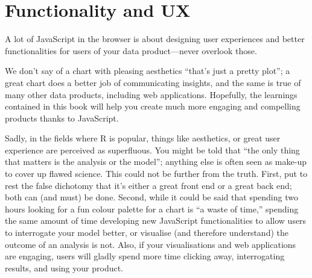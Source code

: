 \documentclass[10pt,]{krantz}
\begin{document}
\hypertarget{conclusion-ux}{%
\section{Functionality and UX}\label{conclusion-ux}}

A lot of JavaScript in the browser is about designing user experiences and better functionalities for users of your data product---never overlook those.

We don't say of a chart with pleasing aesthetics ``that's just a pretty plot''; a great chart does a better job of communicating insights, and the same is true of many other data products, including web applications. Hopefully, the learnings contained in this book will help you create much more engaging and compelling products thanks to JavaScript.

Sadly, in the fields where R is popular, things like aesthetics, or great user experience are perceived as superfluous. You might be told that ``the only thing that matters is the analysis or the model''; anything else is often seen as make-up to cover up flawed science. This could not be further from the truth. First, put to rest the false dichotomy that it's either a great front end or a great back end; both can (and must) be done. Second, while it could be said that spending two hours looking for a fun colour palette for a chart is ``a waste of time,'' spending the same amount of time developing new JavaScript functionalities to allow users to interrogate your model better, or visualise (and therefore understand) the outcome of an analysis is not. Also, if your visualisations and web applications are engaging, users will gladly spend more time clicking away, interrogating results, and using your product.



\backmatter
\printindex
\end{document}
